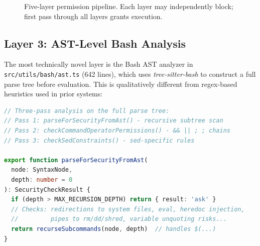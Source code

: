 \documentclass{article}
\newcommand{\file}[1]{\texttt{\small #1}}
\begin{document}
\begin{figure}[t]
\centering
{}
\caption{Five-layer permission pipeline. Each layer may independently block; first pass through all layers grants execution.}
\label{fig:permission}
\end{figure}

\subsection{Layer 3: AST-Level Bash Analysis}

The most technically novel layer is the Bash AST analyzer in \file{src/utils/bash/ast.ts} (642 lines), which uses \emph{tree-sitter-bash} to construct a full parse tree before evaluation. This is qualitatively different from regex-based heuristics used in prior systems:

\begin{lstlisting}[language=TypeScript, caption={AST-based semantic analysis in \texttt{bash/ast.ts}.}]
// Three-pass analysis on the full parse tree:
// Pass 1: parseForSecurityFromAst() - recursive subtree scan
// Pass 2: checkCommandOperatorPermissions() - && || ; ; chains
// Pass 3: checkSedConstraints() - sed-specific rules

export function parseForSecurityFromAst(
  node: SyntaxNode,
  depth: number = 0
): SecurityCheckResult {
  if (depth > MAX_RECURSION_DEPTH) return { result: 'ask' }
  // Checks: redirections to system files, eval, heredoc injection,
  //         pipes to rm/dd/shred, variable unquoting risks...
  return recurseSubcommands(node, depth)  // handles $(...)
}
\end{lstlisting}
\end{document}
